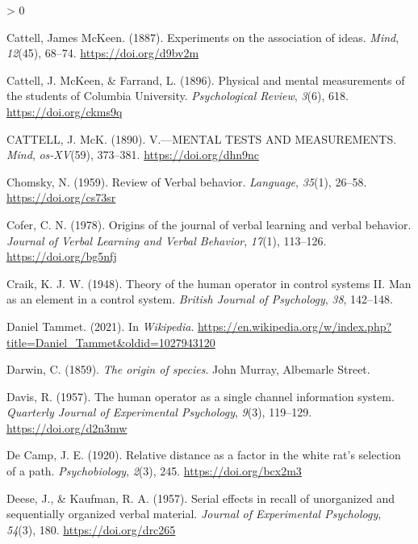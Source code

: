 \documentclass[
  oneside,
  12pt]{crumpbook}
\newlength{\cslhangindent}
\newenvironment{CSLReferences}[2] %
 {%
  \setlength{\parindent}{0pt}
  \ifodd #1 \everypar{\setlength{\hangindent}{\cslhangindent}}\ignorespaces\fi
  \ifnum #2 > 0
  \setlength{\parskip}{#2\baselineskip}
  \fi
 }%
 {}
\begin{document}
\begin{CSLReferences}{1}{0}
\leavevmode\hypertarget{ref-cattellExperimentsAssociationIdeas1887}{}%
Cattell, James McKeen. (1887). Experiments on the association of ideas. \emph{Mind}, \emph{12}(45), 68--74. \url{https://doi.org/d9bv2m}

\leavevmode\hypertarget{ref-cattellPhysicalMentalMeasurements1896}{}%
Cattell, J. McKeen, \& Farrand, L. (1896). Physical and mental measurements of the students of {Columbia University}. \emph{Psychological Review}, \emph{3}(6), 618. \url{https://doi.org/ckms9q}

\leavevmode\hypertarget{ref-cattellMENTALTESTSMEASUREMENTS1890}{}%
CATTELL, J. McK. (1890). V.---{MENTAL TESTS AND MEASUREMENTS}. \emph{Mind}, \emph{os-XV}(59), 373--381. \url{https://doi.org/dhn9nc}

\leavevmode\hypertarget{ref-chomskyReviewVerbalBehavior1959}{}%
Chomsky, N. (1959). Review of {Verbal} behavior. \emph{Language}, \emph{35}(1), 26--58. \url{https://doi.org/cs73sr}

\leavevmode\hypertarget{ref-coferOriginsJournalVerbal1978}{}%
Cofer, C. N. (1978). Origins of the journal of verbal learning and verbal behavior. \emph{Journal of Verbal Learning and Verbal Behavior}, \emph{17}(1), 113--126. \url{https://doi.org/bg5nfj}

\leavevmode\hypertarget{ref-craikTheoryHumanOperator1948}{}%
Craik, K. J. W. (1948). Theory of the human operator in control systems {II}. {Man} as an element in a control system. \emph{British Journal of Psychology}, \emph{38}, 142--148.

\leavevmode\hypertarget{ref-DanielTammet2021}{}%
Daniel {Tammet}. (2021). In \emph{Wikipedia}. \url{https://en.wikipedia.org/w/index.php?title=Daniel_Tammet\&oldid=1027943120}

\leavevmode\hypertarget{ref-darwinOriginSpecies1859}{}%
Darwin, C. (1859). \emph{The origin of species}. {John Murray, Albemarle Street}.

\leavevmode\hypertarget{ref-davisHumanOperatorSingle1957}{}%
Davis, R. (1957). The human operator as a single channel information system. \emph{Quarterly Journal of Experimental Psychology}, \emph{9}(3), 119--129. \url{https://doi.org/d2n3mw}

\leavevmode\hypertarget{ref-decampRelativeDistanceFactor1920}{}%
De Camp, J. E. (1920). Relative distance as a factor in the white rat's selection of a path. \emph{Psychobiology}, \emph{2}(3), 245. \url{https://doi.org/bcx2m3}

\leavevmode\hypertarget{ref-deeseSerialEffectsRecall1957a}{}%
Deese, J., \& Kaufman, R. A. (1957). Serial effects in recall of unorganized and sequentially organized verbal material. \emph{Journal of Experimental Psychology}, \emph{54}(3), 180. \url{https://doi.org/drc265}


\end{CSLReferences}
\end{document}
